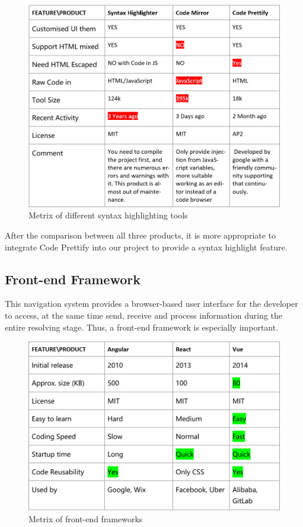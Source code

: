 \documentclass[runningheads]{llncs}
\begin{document}
\begin{figure}[H]
	\centering
	\includegraphics[width=12cm]{pic/highlighter-metrix.png}
	\caption{Metrix of different syntax highlighting tools}
	\label{Metrix of different syntax highlighting tools}
\end{figure}

After the comparison between all three products, it is more appropriate to integrate Code Prettify into our project to provide a syntax highlight feature.

\subsection{Front-end Framework}
This navigation system provides a browser-based user interface for the developer to access, at the same time send, receive and process information during the entire resolving stage. Thus, a front-end framework is especially important.

\begin{figure}[H]
	\centering
	\includegraphics[width=12cm]{pic/front-end-metrix.png}
	\caption{Metrix of front-end frameworks}
	\label{Metrix of front-end frameworks}
\end{figure}
\end{document}
